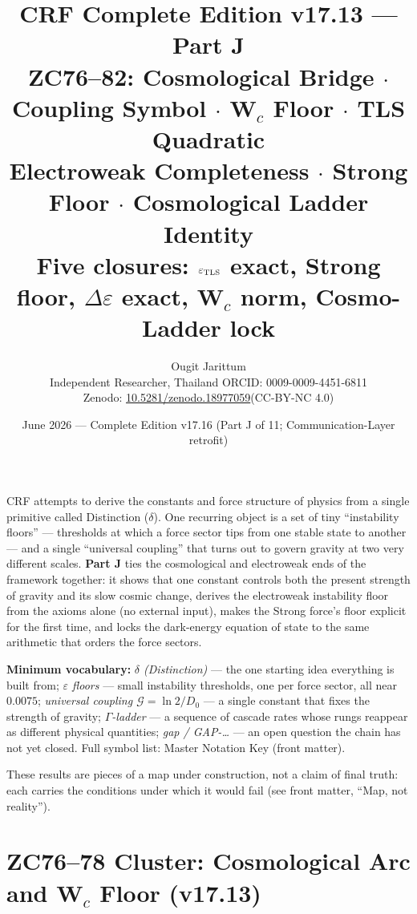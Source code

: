 \documentclass[12pt, a4paper]{article}
\title{%
  \textbf{\color{deepblue}CRF Complete Edition v17.13 --- Part J}\\[0.4em]
  \large ZC76--82: Cosmological Bridge $\cdot$ Coupling Symbol $\cdot$
  W$_c$ Floor $\cdot$ TLS Quadratic\\[0.2em]
  \normalsize\color{mutedgray}
  Electroweak Completeness $\cdot$ Strong Floor $\cdot$
  Cosmological Ladder Identity\\[0.2em]
  \textbf{\color{crfgreen}Five closures: $\varepsilon_{\rm TLS}$ exact,
  Strong floor, $\Delta\varepsilon$ exact, W$_c$ norm, Cosmo-Ladder lock}
}
\author{Ougit Jarittum\\
\small Independent Researcher, Thailand\quad
ORCID: 0009-0009-4451-6811\\
\small Zenodo: \href{https://doi.org/10.5281/zenodo.18977059}%
{10.5281/zenodo.18977059}\quad (CC-BY-NC 4.0)
}
\date{June 2026 --- Complete Edition v17.16 (Part J of 11; Communication-Layer retrofit)}
\begin{document}
\sloppy


\maketitle
\tableofcontents
\newpage

\begin{keybox}[title={If you are just arriving --- Part J in plain language}]
\sloppy
CRF attempts to derive the constants and force structure of physics from a
single primitive called Distinction ($\delta$). One recurring object is a
set of tiny ``instability floors'' --- thresholds at which a force sector
tips from one stable state to another --- and a single ``universal
coupling'' that turns out to govern gravity at two very different scales.
\textbf{Part J} ties the cosmological and electroweak ends of the framework
together: it shows that one constant controls both the present strength of
gravity and its slow cosmic change, derives the electroweak instability
floor from the axioms alone (no external input), makes the Strong force's
floor explicit for the first time, and locks the dark-energy equation of
state to the same arithmetic that orders the force sectors.

\textbf{Minimum vocabulary:}
\textit{$\delta$ (Distinction)} --- the one starting idea everything is
built from;\;
\textit{$\varepsilon$ floors} --- small instability thresholds, one per
force sector, all near $0.0075$;\;
\textit{universal coupling $\mathcal{G}=\ln 2/D_0$} --- a single constant
that fixes the strength of gravity;\;
\textit{$\Gamma$-ladder} --- a sequence of cascade rates whose rungs reappear
as different physical quantities;\;
\textit{gap / GAP-\dots} --- an open question the chain has not yet closed.
Full symbol list: Master Notation Key (front matter).

These results are pieces of a map under construction, not a claim of final
truth: each carries the conditions under which it would fail (see front
matter, ``Map, not reality'').
\end{keybox}

\newpage

\part{ZC76--78 Cluster: Cosmological Arc and W$_c$ Floor
  (v17.13)}
\label{part:XLIX}
\end{document}
